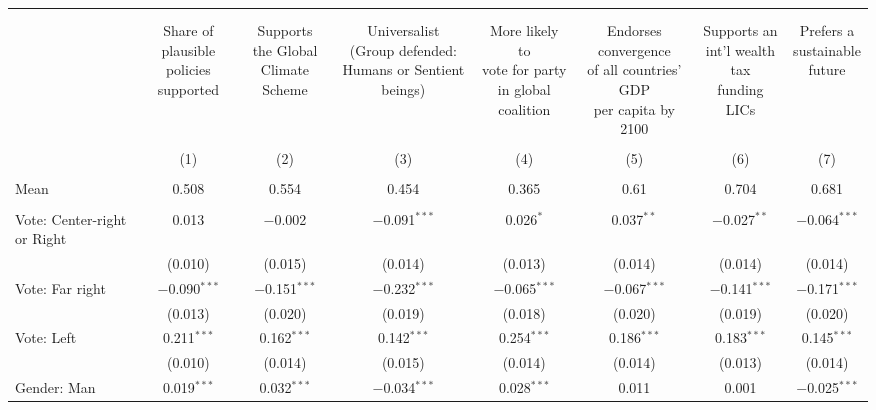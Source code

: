 
\begin{tabular}{@{\extracolsep{5pt}}lccccccc} 
\\[-1.8ex]\hline 
\hline \\[-1.8ex] 
\\[-1.8ex] & \makecell{Share of\\plausible policies\\supported} & \makecell{Supports\\the Global\\Climate Scheme} & \makecell{Universalist\\(Group defended:\\Humans or Sentient beings)} & \makecell{More likely to\\vote for party\\in global coalition} & \makecell{Endorses convergence\\of all countries' GDP\\per capita by 2100} & \makecell{Supports an\\int'l wealth tax\\funding LICs} & \makecell{Prefers a\\sustainable\\future} \\ 
\\[-1.8ex] & (1) & (2) & (3) & (4) & (5) & (6) & (7)\\ 
\hline \\[-1.8ex] 
Mean & 0.508 & 0.554 & 0.454 & 0.365 & 0.61 & 0.704 & 0.681  \\ \hline \\[-1.8ex]
 Vote: Center\mbox{-}right or Right & 0.013 & $-$0.002 & $-$0.091$^{***}$ & 0.026$^{*}$ & 0.037$^{**}$ & $-$0.027$^{**}$ & $-$0.064$^{***}$ \\ 
  & (0.010) & (0.015) & (0.014) & (0.013) & (0.014) & (0.014) & (0.014) \\ 
  Vote: Far right & $-$0.090$^{***}$ & $-$0.151$^{***}$ & $-$0.232$^{***}$ & $-$0.065$^{***}$ & $-$0.067$^{***}$ & $-$0.141$^{***}$ & $-$0.171$^{***}$ \\ 
  & (0.013) & (0.020) & (0.019) & (0.018) & (0.020) & (0.019) & (0.020) \\ 
  Vote: Left & 0.211$^{***}$ & 0.162$^{***}$ & 0.142$^{***}$ & 0.254$^{***}$ & 0.186$^{***}$ & 0.183$^{***}$ & 0.145$^{***}$ \\ 
  & (0.010) & (0.014) & (0.015) & (0.014) & (0.014) & (0.013) & (0.014) \\ 
  Gender: Man & 0.019$^{***}$ & 0.032$^{***}$ & $-$0.034$^{***}$ & 0.028$^{***}$ & 0.011 & 0.001 & $-$0.025$^{***}$ \\ 

\end{tabular}

